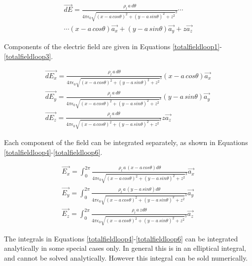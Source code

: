 \documentclass{ximera}
\begin{document}
\begin{eqnarray}
\vec{dE}= \frac{\rho_l \, a \, d\theta }{4 \pi \epsilon_{0} {  \sqrt{(x - a \,cos{\theta})^2 +(y - a \,sin{\theta})^2 +z ^2}  }^3} \cdots  \nonumber \\ \cdots (x -  a \,cos{\theta}) \vec{a_x} +(y - a \,sin{\theta}) \vec{a_y} +z \vec{a_z} \label{totalfieldloop}
\end{eqnarray}

Components of the electric field are given in Equations \ref{totalfieldloop1}-\ref{totalfieldloop3}.


\begin{eqnarray}
\vec{dE_x}= \frac{\rho_l \, a \, d\theta }{4 \pi \epsilon_{0} {  \sqrt{(x - a \,cos{\theta})^2 +(y - a \,sin{\theta})^2 +z ^2}  }^3}   (x -  a \,cos{\theta}) \vec{a_x}  \label{totalfieldloop1} \\
\vec{dE_y}= \frac{\rho_l \, a \, d\theta }{4 \pi \epsilon_{0} {  \sqrt{(x - a \,cos{\theta})^2 +(y - a \,sin{\theta})^2 +z ^2}  }^3}   (y - a \,sin{\theta}) \vec{a_y}  \label{totalfieldloop2} \\
\vec{dE_z}= \frac{\rho_l \, a \, d\theta }{4 \pi \epsilon_{0} {  \sqrt{(x - a \,cos{\theta})^2 +(y - a \,sin{\theta})^2 +z ^2}  }^3}   z \vec{a_z} \label{totalfieldloop3}
\end{eqnarray}

Each component of the field can be  integrated separately, as shown in Equations \ref{totalfieldloop4}-\ref{totalfieldloop6}.



\begin{eqnarray}
\vec{E_x}= \int_0^{2\pi}\frac{\rho_l \,a \,        (x -  a \,cos{\theta})         d\theta }{4 \pi \epsilon_{0} {  \sqrt{(x - a \,cos{\theta})^2 +(y - a \,sin{\theta})^2 +z ^2}  }^3}    \vec{a_x}  \label{totalfieldloop4} \\
\vec{E_y}=  \int_0^{2\pi}\frac{\rho_l \, a \,   (y - a \,sin{\theta})   d\theta }{4 \pi \epsilon_{0} {  \sqrt{(x - a \,cos{\theta})^2 +(y - a \,sin{\theta})^2 +z ^2}  }^3}  \vec{a_y}  \label{totalfieldloop5} \\
\vec{E_z}=  \int_0^{2\pi}\frac{\rho_l \, a \,  z   d\theta }{4 \pi \epsilon_{0} {  \sqrt{(x - a \,cos{\theta})^2 +(y - a \,sin{\theta})^2 +z ^2}  }^3}  \vec{a_z} \label{totalfieldloop6}
\end{eqnarray}

The integrals in Equations \ref{totalfieldloop4}-\ref{totalfieldloop6}  can be integrated analytically  in some special cases only. In general this is in an elliptical integral, and cannot be solved analytically. However this integral can be sold numerically.
\end{document}
